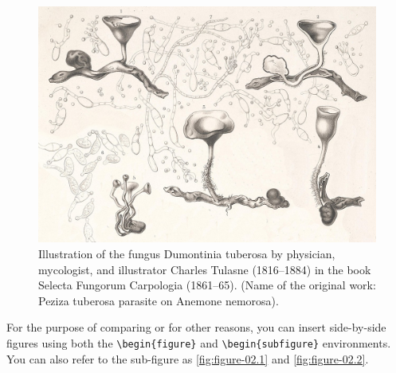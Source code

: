 {\begin{figure}[!htpb]
    \centering
    \includegraphics[width=\linewidth]{Figures/PezizaTuberosa.jpg}
    \caption[Illustration of the fungus Dumontinia tuberosa.]{Illustration of the fungus Dumontinia tuberosa by physician, mycologist, and illustrator Charles Tulasne (1816–1884) in the book Selecta Fungorum Carpologia (1861–65). (Name of the original work: Peziza tuberosa parasite on Anemone nemorosa).}
    \label{fig:figure-01}
\end{figure}

For the purpose of comparing or for other reasons, you can insert side-by-side figures using both the \verb|\begin{figure}| and \verb|\begin{subfigure}| environments. You can also refer to the sub-figure as \autoref{fig:figure-02.1} and \autoref{fig:figure-02.2}.

}
